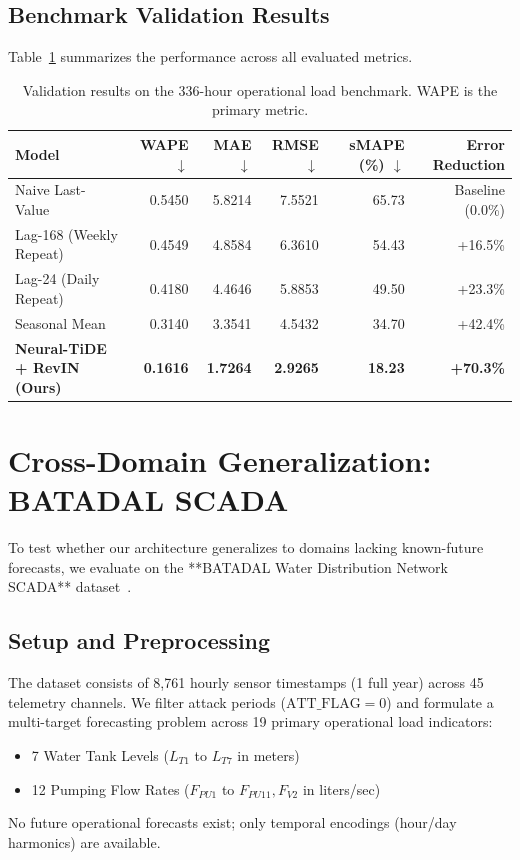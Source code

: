 \documentclass[11pt,a4paper]{article}
\begin{document}
\subsection{Benchmark Validation Results}
Table~\ref{tab:benchmark_results} summarizes the performance across all evaluated metrics.

\begin{table}[h]
\centering
\small
\begin{tabular}{lrrrrr}
\toprule
\textbf{Model} & \textbf{WAPE} $\downarrow$ & \textbf{MAE} $\downarrow$ & \textbf{RMSE} $\downarrow$ & \textbf{sMAPE (\%)} $\downarrow$ & \textbf{Error Reduction} \\
\midrule
Naive Last-Value & 0.5450 & 5.8214 & 7.5521 & 65.73 & Baseline (0.0\%) \\
Lag-168 (Weekly Repeat) & 0.4549 & 4.8584 & 6.3610 & 54.43 & +16.5\% \\
Lag-24 (Daily Repeat) & 0.4180 & 4.4646 & 5.8853 & 49.50 & +23.3\% \\
Seasonal Mean & 0.3140 & 3.3541 & 4.5432 & 34.70 & +42.4\% \\
\midrule
\textbf{Neural-TiDE + RevIN (Ours)} & \textbf{0.1616} & \textbf{1.7264} & \textbf{2.9265} & \textbf{18.23} & \textbf{+70.3\%} \\
\bottomrule
\end{tabular}
\caption{Validation results on the 336-hour operational load benchmark. WAPE is the primary metric.}
\label{tab:benchmark_results}
\end{table}

\section{Cross-Domain Generalization: BATADAL SCADA}

To test whether our architecture generalizes to domains lacking known-future forecasts, we evaluate on the **BATADAL Water Distribution Network SCADA** dataset~\cite{taormina2018batadal}.

\subsection{Setup and Preprocessing}
The dataset consists of 8,761 hourly sensor timestamps (1 full year) across 45 telemetry channels. We filter attack periods ($\text{ATT\_FLAG} = 0$) and formulate a multi-target forecasting problem across 19 primary operational load indicators:
\begin{itemize}
    \item 7 Water Tank Levels ($L_{T1}$ to $L_{T7}$ in meters)
    \item 12 Pumping Flow Rates ($F_{PU1}$ to $F_{PU11}, F_{V2}$ in liters/sec)
\end{itemize}
No future operational forecasts exist; only temporal encodings (hour/day harmonics) are available.
\end{document}
